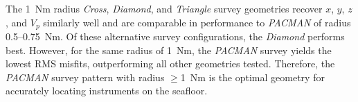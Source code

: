 The 1~Nm radius \textit{Cross}, \textit{Diamond}, and \textit{Triangle} survey geometries recover $x$, $y$, $z$, and $V_{p}$ similarly well and are comparable in performance to \textit{PACMAN} of radius 0.5--0.75~Nm. Of these alternative survey configurations, the \textit{Diamond} performs best. However, for the same radius of 1~Nm, the \textit{PACMAN} survey yields the lowest RMS misfits, outperforming all other geometries tested. Therefore, the \textit{PACMAN} survey pattern with radius $\geq$1~Nm is the optimal geometry for accurately locating instruments on the seafloor.








